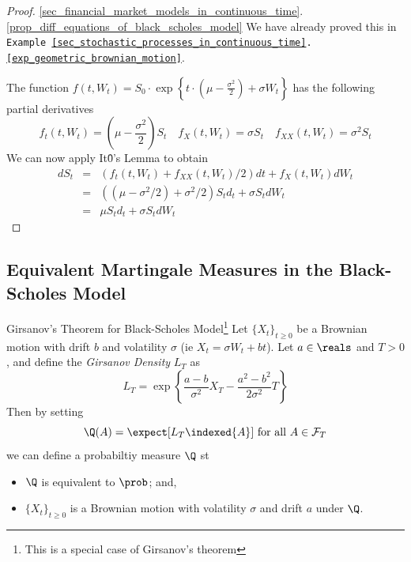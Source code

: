 \documentclass[11pt,a4paper]{article}
\begin{document}
  \begin{proof}{\ref{sec_financial_market_models_in_continuous_time}.\ref{prop_diff_equations_of_black_scholes_model}}
    We have already proved this in \texttt{Example \ref{sec_stochastic_processes_in_continuous_time}.\ref{exp_geometric_brownian_motion}}.
    \par The function $f(t,W_t)=S_0\cdot\exp\left\{t\cdot\left(\mu-\frac{\sigma^2}2\right)+\sigma W_t\right\}$ has the following partial derivatives
    \[ f_t(t,W_t)=(\mu-\frac{\sigma^2}2)S_t\quad f_X(t,W_t)=\sigma S_t\quad f_{XX}(t,W_t)=\sigma^2S_t \]
    We can now apply It\^0's Lemma to obtain
    \[\begin{array}{rcl}
      dS_t&=&(f_t(t,W_t)+f_{XX}(t,W_t)/2)dt+f_X(t,W_t)dW_t\\
      &=&\left((\mu-\sigma^2/2)+\sigma^2/2\right)S_td_t+\sigma S_tdW_t\\
      &=&\mu S_td_t+\sigma S_tdW_t
    \end{array}\]
  \end{proof}

\subsection{Equivalent Martingale Measures in the Black-Scholes Model}

  \begin{theorem}{Girsanov's Theorem for Black-Scholes Model\footnote{This is a special case of Girsanov's theorem}}\label{the_girsanov_theorem}
    Let $\{X_t\}_{t\geq0}$ be a Brownian motion with drift $b$ and volatility $\sigma$ (ie $X_t=\sigma W_t+bt$). Let $a\in\reals$ and $T>0$, and define the \textit{Girsanov Density} $L_T$ as
    \[ L_T=\exp\left\{\frac{a-b}{\sigma^2}X_T-\frac{a^2-b^2}{2\sigma^2}T\right\} \]
    Then by setting
    \[ \Q(A)=\expect[L_T\indexed\{A\}]\text{ for all }A\in\mathcal{F}_T \]
    we can define a probabiltiy measure $\Q$ st
    \begin{itemize}
      \item $\Q$ is equivalent to $\prob$; and,
      \item $\{X_t\}_{t\geq0}$ is a Brownian motion with volatility $\sigma$ and drift $a$ under $\Q$.
    \end{itemize}
  \end{theorem}
\end{document}
